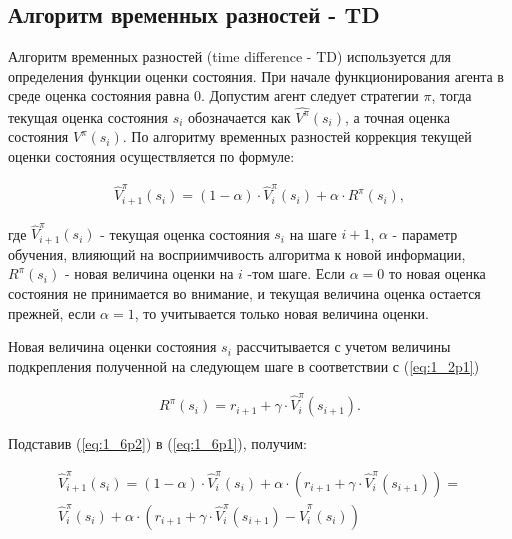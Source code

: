 \subsection{Алгоритм временных разностей - TD} \label{subsect1_6_1}

Алгоритм временных разностей (time difference - TD) используется для определения функции оценки состояния. При начале функционирования агента в среде оценка состояния равна 0. Допустим агент следует стратегии $ \pi $, тогда текущая оценка состояния $ s_i $ обозначается как $ \hat{V^{\pi}}(s_i) $, а точная оценка состояния $ V^{\pi}(s_i) $. По алгоритму временных разностей коррекция текущей оценки состояния осуществляется по формуле:

\begin{equation}
\label{eq:1_6p1}
\begin{alignedat}{2}
\hat{V}^{\pi}_{i+1}(s_i) = (1-\alpha)\cdot\hat{V}^{\pi}_{i}(s_i)+\alpha\cdot R^{\pi}(s_i),
\end{alignedat}
\end{equation}

\noindent где $ \hat{V}^{\pi}_{i+1}(s_i) $ - текущая оценка состояния $ s_i $ на шаге $ i+1 $, $ \alpha $ - параметр обучения, влияющий на восприимчивость алгоритма к новой информации, $ R^{\pi}(s_i) $ - новая величина оценки на $ i $ -том шаге. Если $ \alpha = 0 $ то новая оценка состояния не принимается во внимание, и текущая величина оценка остается прежней, если $ \alpha = 1 $, то учитывается только новая величина оценки.

Новая величина оценки состояния $ s_i $ рассчитывается с учетом величины подкрепления полученной на следующем шаге в соответствии с (\ref{eq:1_2p1})

\begin{equation}
\label{eq:1_6p2}
\begin{alignedat}{2}
R^{\pi}(s_i) = r_{i+1} + \gamma\cdot\hat{V}^{\pi}_{i}(s_{i+1}).
\end{alignedat}
\end{equation}

Подставив (\ref{eq:1_6p2}) в (\ref{eq:1_6p1}), получим:

\begin{equation}
\label{eq:1_6p3}
\begin{alignedat}{2}
\hat{V}^{\pi}_{i+1}(s_i) = (1-\alpha)\cdot\hat{V}^{\pi}_{i}(s_i)+\alpha\cdot ( r_{i+1} + \gamma\cdot\hat{V}^{\pi}_{i}(s_{i+1})) = \\ \hat{V}^{\pi}_{i}(s_i)+\alpha\cdot(r_{i+1}+ \gamma\cdot\hat{V}^{\pi}_{i}(s_{i+1})-\hat{V}^{\pi}_{i}(s_{i}))
\end{alignedat}
\end{equation}

